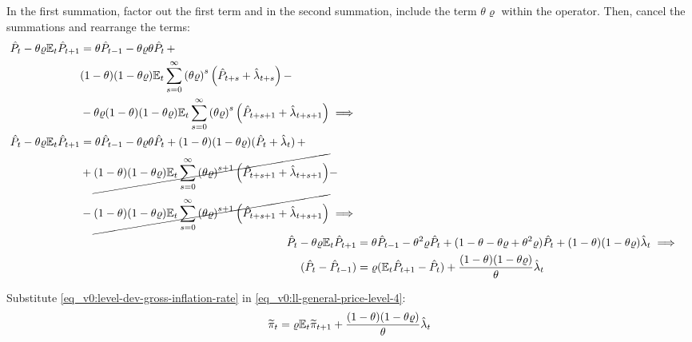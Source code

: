 \documentclass[../thesis.tex]{subfiles}
\begin{document}
	In the first summation, factor out the first term and in the second summation, include the term $\theta \varrho$ within the operator. Then, cancel the summations and rearrange the terms:
	\begin{align}
		\begin{split}
			\hat{P}_t - \theta \varrho {\mathbb{E}_{t}} \hat{P}_{t+1} &= \theta \hat{P}_{t-1} - \theta \varrho \theta \hat{P}_t \, + \\
			& (1-\theta) (1- \theta \varrho) {\mathbb{E}_{t}} \sum_{s=0}^{\infty} \left( \theta \varrho \right)^s \left( \hat{P}_{t+s} + \hat{\lambda}_{t+s} \right) -
			\\
			& - \theta \varrho (1-\theta) (1- \theta \varrho) {\mathbb{E}_{t}} \sum_{s=0}^{\infty} \left( \theta \varrho \right)^s \left( \hat{P}_{t+s+1} + \hat{\lambda}_{t+s+1} \right) \implies \nonumber 
		\end{split} \\
		\begin{split}
			\hat{P}_t - \theta \varrho {\mathbb{E}_{t}} \hat{P}_{t+1} &= \theta \hat{P}_{t-1} - \theta \varrho \theta \hat{P}_t + (1-\theta) (1- \theta \varrho) (\hat{P}_t + \hat{\lambda}_t) \, + 
			\\
			& + \cancel{(1-\theta) (1- \theta \varrho) {\mathbb{E}_{t}} \sum_{s=0}^{\infty} \left( \theta \varrho \right)^{s+1} \left( \hat{P}_{t+s+1} + \hat{\lambda}_{t+s+1} \right)} -
			\\
			& - \cancel{(1-\theta) (1- \theta \varrho) {\mathbb{E}_{t}} \sum_{s=0}^{\infty} \left( \theta \varrho \right)^{s+1} \left( \hat{P}_{t+s+1} + \hat{\lambda}_{t+s+1} \right)} \implies \nonumber 
		\end{split} \\
		\hat{P}_t - \theta \varrho {\mathbb{E}_{t}} \hat{P}_{t+1} &= \theta \hat{P}_{t-1} - \theta^2 \varrho \hat{P}_t + (1- \theta -\theta \varrho + \theta^2 \varrho) \hat{P}_t + (1-\theta) (1- \theta \varrho) \hat{\lambda}_t \implies \nonumber \\
		(\hat{P}_t - \hat{P}_{t-1}) &= \varrho ({\mathbb{E}_{t}} \hat{P}_{t+1} - \hat{P}_t) + \frac{(1-\theta) (1- \theta \varrho)}{\theta} \hat{\lambda}_t
		\label{eq_v0:ll-general-price-level-4}
	\end{align}
	
	Substitute \ref{eq_v0:level-dev-gross-inflation-rate} in \ref{eq_v0:ll-general-price-level-4}:
	\begin{align}
		\widetilde{\pi}_t = \varrho {\mathbb{E}_{t}} \widetilde{\pi}_{t+1} + \frac{(1-\theta) (1- \theta \varrho)}{\theta} \hat{\lambda}_t \label{eq_v0:nk-phillips-curve-mc}
	\end{align}
	
\end{document}
